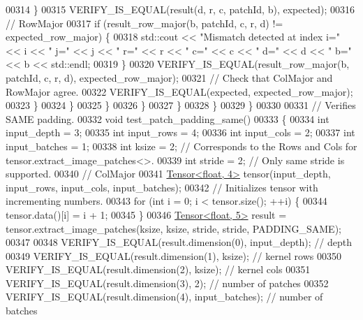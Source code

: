 \begin{DoxyCode}
00314               \}
00315               VERIFY\_IS\_EQUAL(result(d, r, c, patchId, b), expected);
00316               \textcolor{comment}{// RowMajor}
00317               \textcolor{keywordflow}{if} (result\_row\_major(b, patchId, c, r, d) != expected\_row\_major) \{
00318                 std::cout << \textcolor{stringliteral}{"Mismatch detected at index i="} << i << \textcolor{stringliteral}{" j="} << j << \textcolor{stringliteral}{" r="} << r << \textcolor{stringliteral}{" c="} << c
       << \textcolor{stringliteral}{" d="} << d << \textcolor{stringliteral}{" b="} << b << std::endl;
00319               \}
00320               VERIFY\_IS\_EQUAL(result\_row\_major(b, patchId, c, r, d), expected\_row\_major);
00321               \textcolor{comment}{// Check that ColMajor and RowMajor agree.}
00322               VERIFY\_IS\_EQUAL(expected, expected\_row\_major);
00323             \}
00324           \}
00325         \}
00326       \}
00327     \}
00328   \}
00329 \}
00330 
00331 \textcolor{comment}{// Verifies SAME padding.}
00332 \textcolor{keywordtype}{void} test\_patch\_padding\_same()
00333 \{
00334   \textcolor{keywordtype}{int} input\_depth = 3;
00335   \textcolor{keywordtype}{int} input\_rows = 4;
00336   \textcolor{keywordtype}{int} input\_cols = 2;
00337   \textcolor{keywordtype}{int} input\_batches = 1;
00338   \textcolor{keywordtype}{int} ksize = 2;  \textcolor{comment}{// Corresponds to the Rows and Cols for tensor.extract\_image\_patches<>.}
00339   \textcolor{keywordtype}{int} stride = 2;  \textcolor{comment}{// Only same stride is supported.}
00340   \textcolor{comment}{// ColMajor}
00341   \hyperlink{class_eigen_1_1_tensor}{Tensor<float, 4>} tensor(input\_depth, input\_rows, input\_cols, input\_batches);
00342   \textcolor{comment}{// Initializes tensor with incrementing numbers.}
00343   \textcolor{keywordflow}{for} (\textcolor{keywordtype}{int} i = 0; i < tensor.size(); ++i) \{
00344     tensor.data()[i] = i + 1;
00345   \}
00346   \hyperlink{class_eigen_1_1_tensor}{Tensor<float, 5>} result = tensor.extract\_image\_patches(ksize, ksize, stride, stride, 
      PADDING\_SAME);
00347 
00348   VERIFY\_IS\_EQUAL(result.dimension(0), input\_depth);  \textcolor{comment}{// depth}
00349   VERIFY\_IS\_EQUAL(result.dimension(1), ksize);  \textcolor{comment}{// kernel rows}
00350   VERIFY\_IS\_EQUAL(result.dimension(2), ksize);  \textcolor{comment}{// kernel cols}
00351   VERIFY\_IS\_EQUAL(result.dimension(3), 2);  \textcolor{comment}{// number of patches}
00352   VERIFY\_IS\_EQUAL(result.dimension(4), input\_batches);  \textcolor{comment}{// number of batches}

\end{DoxyCode}
